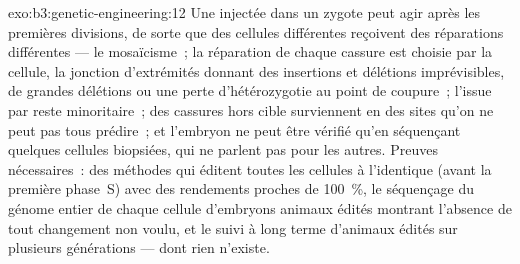 \begin{solution}{exo:b3:genetic-engineering:12}
Une  injectée dans un zygote peut agir après les premières
divisions, de sorte que des cellules différentes reçoivent des
réparations différentes --- le mosaïcisme~; la réparation de chaque
cassure est choisie par la cellule, la jonction d'extrémités donnant
des insertions et délétions imprévisibles, de grandes délétions ou une
perte d'hétérozygotie au point de coupure~; l'issue par  reste minoritaire~; des cassures hors cible surviennent en
des sites qu'on ne peut pas tous prédire~; et l'embryon ne peut être
vérifié qu'en séquençant quelques cellules biopsiées, qui ne parlent
pas pour les autres. Preuves nécessaires~: des méthodes qui éditent
toutes les cellules à l'identique (avant la première phase~S) avec des
rendements proches de \qty{100}{\%}, le séquençage du génome entier de
chaque cellule d'embryons animaux édités montrant l'absence de tout
changement non voulu, et le suivi à long terme d'animaux édités sur
plusieurs générations --- dont rien n'existe.
\end{solution}

